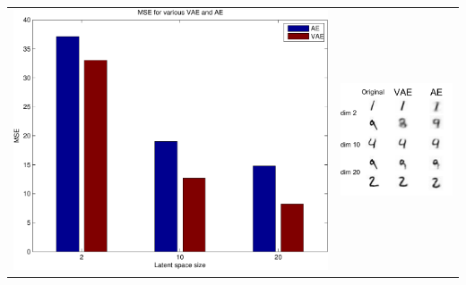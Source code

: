 \documentclass[landscape,a0b,final,a4resizeable]{include/a0poster}
\begin{document}
\begin{poster}
\begin{multicols}{3}
\begin{tabular}{cc}
\begin{minipage}[c]{0.5\columnwidth}
\hspace{0em}
\includegraphics[width=0.8\columnwidth]{../res/mnist_mse.pdf}
\end{minipage} & 
\begin{minipage}[c]{0.5\columnwidth}
\begin{center}
\vspace{1.0cm}
\includegraphics[width=.9\columnwidth]{../res/recon_mnist_compre.pdf}
\end{center}
\end{minipage}
\end{tabular}



\end{multicols}
\end{poster}
\end{document}
